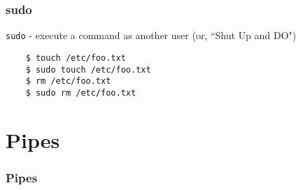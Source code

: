 \documentclass{beamer}
\begin{document}

\begin{frame}[fragile]
\frametitle{sudo}
	\texttt{sudo} - execute a command as another user (or, ``Shut Up and DO")
	\begin{verbatim}
	$ touch /etc/foo.txt
	$ sudo touch /etc/foo.txt
	$ rm /etc/foo.txt
	$ sudo rm /etc/foo.txt
	\end{verbatim}
\end{frame}

\section{Pipes}

\begin{frame}[fragile]
\frametitle{Pipes}
	\begin{verbatim}
	\end{verbatim}
\end{frame}
\end{document}
